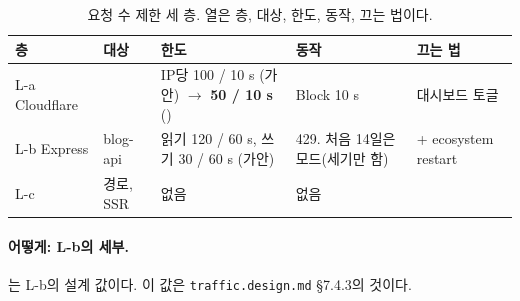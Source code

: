 \begin{table}[H]
  \caption{요청 수 제한 세 층. 열은 층, 대상, 한도, 동작, 끄는 법이다.}
  \label{tab:bl-layers}
  \centering\footnotesize
  \begin{tabularx}{\linewidth}{@{}L{1.8cm}L{1.9cm}L{3.2cm}L{3.0cm}Y@{}}
    \toprule
    층 & 대상 & 한도 & 동작 & 끄는 법 \\
    \midrule
    L-a Cloudflare &  & IP당 100 / 10 s (가안) $\to$ \textbf{50 / 10 s} () & Block 10 s & 대시보드 토글 \\
    \midrule
    L-b Express & blog-api & 읽기 120 / 60 s, 쓰기 30 / 60 s (가안) & 429. 처음 14일은  모드(세기만 함) &  + ecosystem restart \\
    \midrule
    L-c &  경로, SSR & 없음 & 없음 & \\
    \bottomrule
  \end{tabularx}
\end{table}

\paragraph{어떻게: L-b의 세부.}
는 L-b의 설계 값이다.
이 값은 \texttt{traffic.design.md} \S 7.4.3의 것이다.


